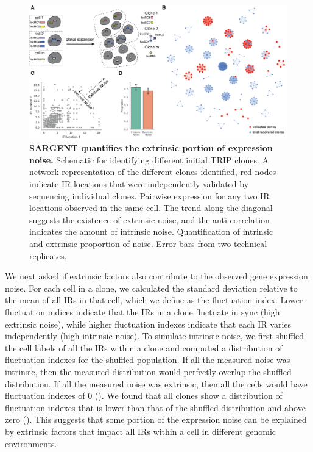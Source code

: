 \begin{figure}[t!]  
    \centering
    \includegraphics[width=\linewidth]{figures/cas/cas_figure4.png}
    \caption[SARGENT quantifies the extrinsic portion of expression noise.]{%
        \textbf{SARGENT quantifies the extrinsic portion of expression noise.}
        Schematic for identifying different initial TRIP clones.
        A network representation of the different clones identified, red nodes indicate IR locations that were independently validated by sequencing individual clones.
        Pairwise expression for any two IR locations observed in the same cell. The trend along the diagonal suggests the existence of extrinsic noise, and the anti-correlation indicates the amount of intrinsic noise.
        Quantification of intrinsic and extrinsic proportion of noise. Error bars from two technical replicates. 
    }
    \label{fig:cas_figure4}
\end{figure}

We next asked if extrinsic factors also contribute to the observed gene expression noise. For each cell in a clone, we calculated the standard deviation relative to the mean of all IRs in that cell, which we define as the fluctuation index. Lower fluctuation indices indicate that the IRs in a clone fluctuate in sync (high extrinsic noise), while higher fluctuation indexes indicate that each IR varies independently (high intrinsic noise). To simulate intrinsic noise, we first shuffled the cell labels of all the IRs within a clone and computed a distribution of fluctuation indexes for the shuffled population. If all the measured noise was intrinsic, then the measured distribution would perfectly overlap the shuffled distribution. If all the measured noise was extrinsic, then all the cells would have fluctuation indexes of 0 (). We found that all clones show a distribution of fluctuation indexes that is lower than that of the shuffled distribution and above zero (). This suggests that some portion of the expression noise can be explained by extrinsic factors that impact all IRs within a cell in different genomic environments.

